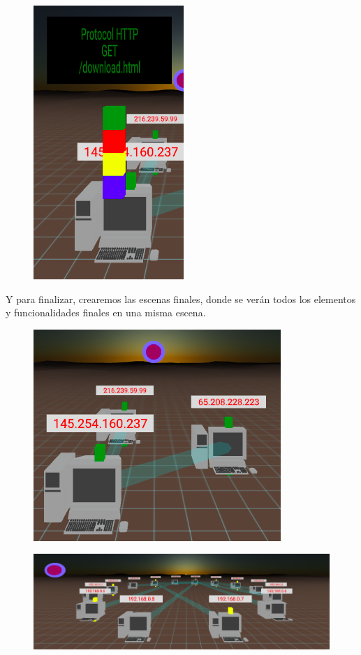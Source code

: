 \documentclass[a4paper, 12pt]{book}
\begin{document}
\begin{figure}[h]
    \includegraphics[scale=0.44]{img/capa_http4.png}
\end{figure}

\newpage
Y para finalizar, crearemos las escenas finales, donde se verán todos los elementos y funcionalidades finales en una misma escena.

\begin{figure}[h]
\centering
    \includegraphics[scale=0.7]{img/fin1.png}
\end{figure}

\begin{figure}[h]
\centering
    \includegraphics[scale=0.52]{img/din2.png}
\end{figure}
\end{document}

